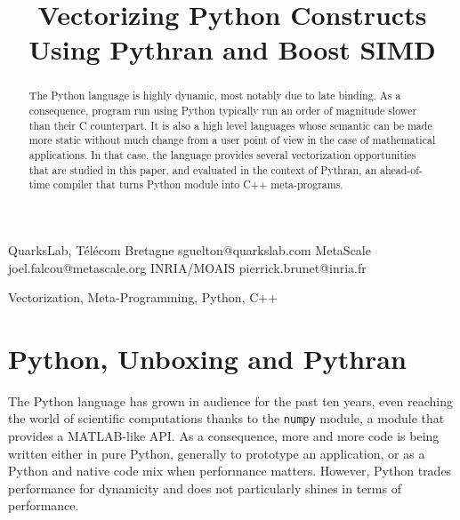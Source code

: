 \documentclass[preprint]{sigplanconf}
\begin{document}
\setlength{\pdfpageheight}{\paperheight}
\setlength{\pdfpagewidth}{\paperwidth}


\title{Vectorizing Python Constructs Using Pythran and Boost SIMD}

           {QuarksLab, T{\'e}l{\'e}com Bretagne}
           {sguelton@quarkslab.com}
           {MetaScale}
           {joel.falcou@metascale.org}
           {INRIA/MOAIS}
           {pierrick.brunet@inria.fr}

\maketitle

\begin{abstract}

    The Python language is highly dynamic, most notably due to late binding. As
    a consequence, program run using Python typically run an order of magnitude
    slower than their C counterpart. It is also a high level languages whose
    semantic can be made more static without much change from a user point of
    view in the case of mathematical applications. In that case, the language
    provides several vectorization opportunities that are studied in this
    paper, and evaluated in the context of Pythran, an ahead-of-time compiler
    that turns Python module into C++ meta-programs.

\end{abstract}



\keywords
Vectorization, Meta-Programming, Python, C++


\section{Python, Unboxing and Pythran}

The Python language has grown in audience for the past ten years, even reaching
the world of scientific computations thanks to the \texttt{numpy} module, a
module that provides a MATLAB-like API. As a consequence, more and more code is
being written either in pure Python, generally to prototype an application, or
as a Python and native code mix when performance matters. However, Python
trades performance for dynamicity and does not particularly shines in terms of
performance.
\end{document}
